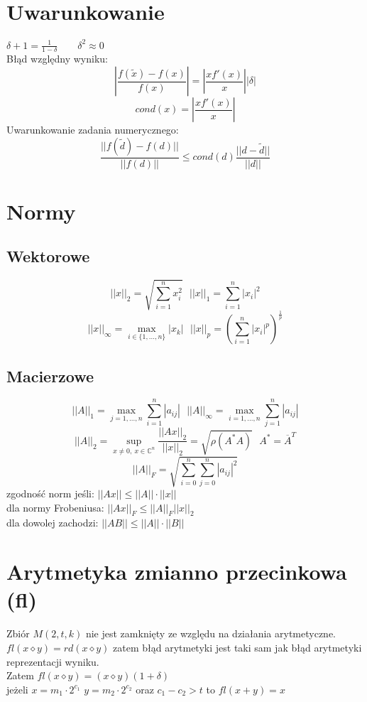 \documentclass[10pt,twocolumn]{article}
\begin{document}
\begin{flushleft}
\section{Uwarunkowanie}
$\delta+1 = \frac{1}{1-\delta} \qquad \delta^{2} \approx 0$\\
Błąd względny wyniku: $$\left| \frac{f(\widetilde{x}) - f(x)}{f(x)} \right| = \left| \frac{xf'(x)}{x} \right| |\delta|$$
$$cond(x) = \left| \frac{xf'(x)}{x} \right| $$
Uwarunkowanie zadania numerycznego: $$\frac{||f(\widetilde{d}) - f(d)||}{||f(d)||} \leq cond(d) \frac{||d - \widetilde{d}||}{||d||}$$

\section{Normy}
\subsection{Wektorowe}
$$ ||x||_{2} = \sqrt{\sum_{i=1}^{n} x_{i}^{2}} \ \ \ ||x||_{1} = \sum_{i=1}^{n} |x_{i}|^{2} $$
$$ ||x||_{\infty} = \max_{i \in \{1,...,n\}} |x_{k}| \ \ \  ||x||_{p} = \left(\sum_{i=1}^{n}|x_{i}|^{p}\right)^{\frac{1}{p}} $$
\subsection{Macierzowe}
$$ ||A||_{1} = \max_{j=1,...,n} \sum_{i=1}^{n}|a_{ij}| \ \ \ ||A||_{\infty} = \max_{i=1,...,n} \sum_{j=1}^{n}|a_{ij}| $$
$$\mathbb{}$$
$$ ||A||_{2} = \sup_{x \neq 0, \ x \in \mathbb{C}^{n}} \frac{||Ax||_{2}}{||x||_{2}} = \sqrt{\rho\left(A^{*}A\right)} \ \ \ A^{*} = \overline{A}^{T}$$
$$ ||A||_{F} = \sqrt{\sum_{i = 0}^{n} \sum_{j = 0}^{n} |a_{ij}|^{2}} $$
zgodność norm jeśli: $||Ax|| \leq ||A|| \cdot ||x||$\\
dla normy Frobeniusa: $||Ax||_{F} \leq ||A||_{F} ||x||_{2}$\\
dla dowolej zachodzi: $||AB|| \leq ||A|| \cdot ||B||$

\section{Arytmetyka zmianno przecinkowa (fl)}
Zbiór $M( 2,t,k )$ nie jest zamknięty ze względu na działania arytmetyczne. 
$fl(x \diamond y) = rd(x \diamond y)$ zatem błąd arytmetyki jest taki sam jak błąd arytmetyki reprezentacji wyniku.\\
Zatem $fl(x \diamond y) = (x \diamond y)(1 + \delta) $\\ jeżeli $x = m_{1}\cdot2^{c_{1}}$ $y = m_{2}\cdot2^{c_{2}}$ oraz $c_{1} -c_{2} > t$ to $fl(x+y) = x$


\end{flushleft}
\end{document}
